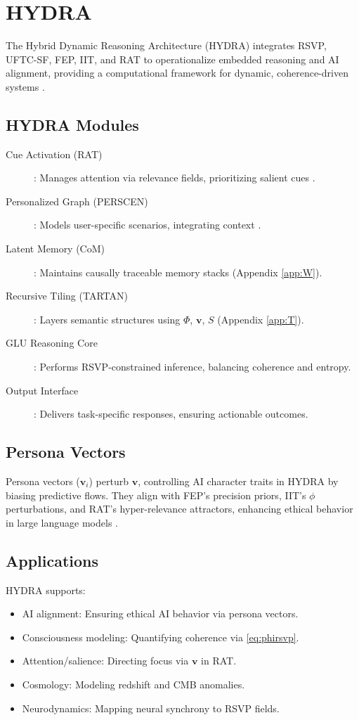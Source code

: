 \documentclass[12pt]{report}
\newcommand{\PhiRSVP}{\Phi}
\newcommand{\vRSVP}{\mathbf{v}}
\newcommand{\SRSVP}{S}
\begin{document}
\chapter{HYDRA}
\label{chap:hydra}
The Hybrid Dynamic Reasoning Architecture (HYDRA) integrates RSVP, UFTC-SF, FEP, IIT, and RAT to operationalize embedded reasoning and AI alignment, providing a computational framework for dynamic, coherence-driven systems \citep{HYDRA2025}.

\section{HYDRA Modules}
\begin{description}
    \item[Cue Activation (RAT)]: Manages attention via relevance fields, prioritizing salient cues \citep{RAT2025}.
    \item[Personalized Graph (PERSCEN)]: Models user-specific scenarios, integrating context \citep{Du2025PERSCEN}.
    \item[Latent Memory (CoM)]: Maintains causally traceable memory stacks (Appendix \ref{app:W}).
    \item[Recursive Tiling (TARTAN)]: Layers semantic structures using \(\PhiRSVP\), \(\vRSVP\), \(\SRSVP\) (Appendix \ref{app:T}).
    \item[GLU Reasoning Core]: Performs RSVP-constrained inference, balancing coherence and entropy.
    \item[Output Interface]: Delivers task-specific responses, ensuring actionable outcomes.
\end{description}

\section{Persona Vectors}
Persona vectors (\(\mathbf{v}_i\)) perturb \(\vRSVP\), controlling AI character traits in HYDRA by biasing predictive flows. They align with FEP’s precision priors, IIT’s \(\phi\) perturbations, and RAT’s hyper-relevance attractors, enhancing ethical behavior in large language models \citep{Chen2025, HYDRA2025}.

\section{Applications}
HYDRA supports:
\begin{itemize}
    \item AI alignment: Ensuring ethical AI behavior via persona vectors.
    \item Consciousness modeling: Quantifying coherence via \eqref{eq:phirsvp}.
    \item Attention/salience: Directing focus via \(\vRSVP\) in RAT.
    \item Cosmology: Modeling redshift and CMB anomalies.
    \item Neurodynamics: Mapping neural synchrony to RSVP fields.
\end{itemize}
\end{document}
